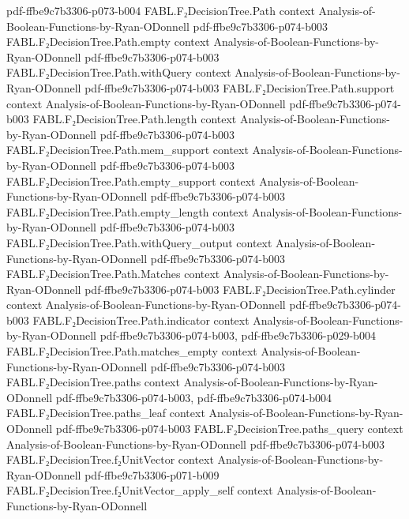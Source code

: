 \begin{theorem}
  {pdf-ffbe9c7b3306-p073-b004}
\proofstep
  {FABL.F₂DecisionTree.Path}
  {context}
  {Analysis-of-Boolean-Functions-by-Ryan-ODonnell}
  {pdf-ffbe9c7b3306-p074-b003}
\proofstep
  {FABL.F₂DecisionTree.Path.empty}
  {context}
  {Analysis-of-Boolean-Functions-by-Ryan-ODonnell}
  {pdf-ffbe9c7b3306-p074-b003}
\proofstep
  {FABL.F₂DecisionTree.Path.withQuery}
  {context}
  {Analysis-of-Boolean-Functions-by-Ryan-ODonnell}
  {pdf-ffbe9c7b3306-p074-b003}
\proofstep
  {FABL.F₂DecisionTree.Path.support}
  {context}
  {Analysis-of-Boolean-Functions-by-Ryan-ODonnell}
  {pdf-ffbe9c7b3306-p074-b003}
\proofstep
  {FABL.F₂DecisionTree.Path.length}
  {context}
  {Analysis-of-Boolean-Functions-by-Ryan-ODonnell}
  {pdf-ffbe9c7b3306-p074-b003}
\proofstep
  {FABL.F₂DecisionTree.Path.mem_support}
  {context}
  {Analysis-of-Boolean-Functions-by-Ryan-ODonnell}
  {pdf-ffbe9c7b3306-p074-b003}
\proofstep
  {FABL.F₂DecisionTree.Path.empty_support}
  {context}
  {Analysis-of-Boolean-Functions-by-Ryan-ODonnell}
  {pdf-ffbe9c7b3306-p074-b003}
\proofstep
  {FABL.F₂DecisionTree.Path.empty_length}
  {context}
  {Analysis-of-Boolean-Functions-by-Ryan-ODonnell}
  {pdf-ffbe9c7b3306-p074-b003}
\proofstep
  {FABL.F₂DecisionTree.Path.withQuery_output}
  {context}
  {Analysis-of-Boolean-Functions-by-Ryan-ODonnell}
  {pdf-ffbe9c7b3306-p074-b003}
\proofstep
  {FABL.F₂DecisionTree.Path.Matches}
  {context}
  {Analysis-of-Boolean-Functions-by-Ryan-ODonnell}
  {pdf-ffbe9c7b3306-p074-b003}
\proofstep
  {FABL.F₂DecisionTree.Path.cylinder}
  {context}
  {Analysis-of-Boolean-Functions-by-Ryan-ODonnell}
  {pdf-ffbe9c7b3306-p074-b003}
\proofstep
  {FABL.F₂DecisionTree.Path.indicator}
  {context}
  {Analysis-of-Boolean-Functions-by-Ryan-ODonnell}
  {pdf-ffbe9c7b3306-p074-b003,
    pdf-ffbe9c7b3306-p029-b004}
\proofstep
  {FABL.F₂DecisionTree.Path.matches_empty}
  {context}
  {Analysis-of-Boolean-Functions-by-Ryan-ODonnell}
  {pdf-ffbe9c7b3306-p074-b003}
\proofstep
  {FABL.F₂DecisionTree.paths}
  {context}
  {Analysis-of-Boolean-Functions-by-Ryan-ODonnell}
  {pdf-ffbe9c7b3306-p074-b003,
    pdf-ffbe9c7b3306-p074-b004}
\proofstep
  {FABL.F₂DecisionTree.paths_leaf}
  {context}
  {Analysis-of-Boolean-Functions-by-Ryan-ODonnell}
  {pdf-ffbe9c7b3306-p074-b003}
\proofstep
  {FABL.F₂DecisionTree.paths_query}
  {context}
  {Analysis-of-Boolean-Functions-by-Ryan-ODonnell}
  {pdf-ffbe9c7b3306-p074-b003}
\proofstep
  {FABL.F₂DecisionTree.f₂UnitVector}
  {context}
  {Analysis-of-Boolean-Functions-by-Ryan-ODonnell}
  {pdf-ffbe9c7b3306-p071-b009}
\proofstep
  {FABL.F₂DecisionTree.f₂UnitVector_apply_self}
  {context}
  {Analysis-of-Boolean-Functions-by-Ryan-ODonnell}

\end{theorem}

